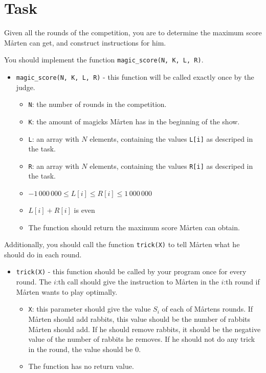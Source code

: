 \section*{Task}
Given all the rounds of the competition, you are to determine the maximum score Mårten can get,
and construct instructions for him.

You should implement the function \texttt{magic\_score(N, K, L, R)}.
\begin{itemize}
  \item \texttt{magic\_score(N, K, L, R)} - this function will be called exactly once by the judge.
  \begin{itemize}
    \item \texttt{N}: the number of rounds in the competition.
    \item \texttt{K}: the amount of magicks Mårten has in the beginning of the show.
    \item \texttt{L}: an array with $N$ elements, containing the values \texttt{L[i]} as descriped in the task.
    \item \texttt{R}: an array with $N$ elements, containing the values \texttt{R[i]} as descriped in the task.
    \item $-1\,000\,000 \le L[i] \le R[i] \le 1\,000\,000$
    \item $L[i] + R[i]$ is even
    \item The function should return the maximum score Mårten can obtain.
  \end{itemize}

\end{itemize}

Additionally, you should call the function \texttt{trick(X)} to tell Mårten what he should do in each round.
\begin{itemize}
  \item \texttt{trick(X)} - this function should be called by your program once for every round. The $i$:th call should give the instruction
    to Mårten in the $i$:th round if Mårten wants to play optimally.
  \begin{itemize}
    \item \texttt{X}: this parameter should give the value $S_i$ of each of Mårtens rounds.
      If Mårten should add rabbits,
      this value should be the number of rabbits Mårten should add. If he should remove rabbits, it should be the negative
      value of the number of rabbits he removes. If he should not do any trick in the round, the value should be $0$. 
    \item The function has no return value.
  \end{itemize}
\end{itemize}

